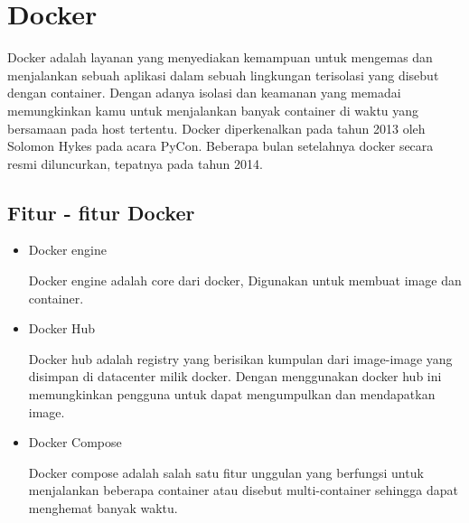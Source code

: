 \section{Docker}
Docker adalah layanan yang menyediakan kemampuan untuk mengemas dan menjalankan sebuah aplikasi dalam sebuah lingkungan terisolasi yang disebut dengan container.
Dengan adanya isolasi dan keamanan yang memadai memungkinkan kamu untuk menjalankan banyak container di waktu yang bersamaan pada host tertentu.
Docker diperkenalkan pada tahun 2013 oleh Solomon Hykes pada acara PyCon. Beberapa bulan setelahnya docker secara resmi diluncurkan, tepatnya pada tahun 2014.
\subsection{Fitur - fitur Docker}
\begin{itemize}
  \item Docker engine
  
  Docker engine adalah core dari docker, Digunakan untuk membuat image dan container.

  \item Docker Hub
  
  Docker hub adalah registry yang berisikan kumpulan dari image-image yang disimpan di datacenter milik docker.
  Dengan menggunakan docker hub ini memungkinkan pengguna untuk dapat mengumpulkan dan mendapatkan image.  

  \item Docker Compose
  
  Docker compose adalah salah satu fitur unggulan yang berfungsi untuk menjalankan beberapa container atau disebut multi-container sehingga dapat menghemat banyak waktu.

\end{itemize}


